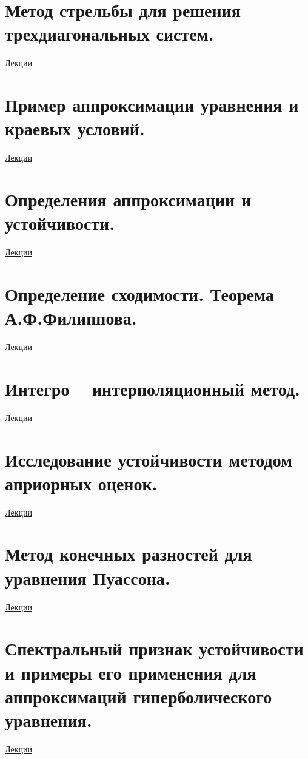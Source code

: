 \documentclass[specialist, subf, href, colorlinks=true, 12pt, times, mtpro, final]{disser}
\theoremstyle{definition}
\begin{document}
\section {Метод стрельбы для решения трехдиагональных систем.}
	\hyperlink {lects.112}{Лекции}\\

\section {Пример аппроксимации уравнения и краевых условий.}
	\hyperlink {lects.115}{Лекции}\\

\section {Определения аппроксимации и устойчивости.}
	\hyperlink {lects.118}{Лекции}\\

\section {Определение сходимости. Теорема А.Ф.Филиппова.}
	\hyperlink {lects.120}{Лекции}\\

\section {Интегро -- интерполяционный метод.}
	\hyperlink {lects.121}{Лекции}\\

\section {Исследование устойчивости методом априорных оценок.}
	\hyperlink {lects.125}{Лекции}\\

\section {Метод конечных разностей для уравнения Пуассона.}
	\hyperlink {lects.128}{Лекции}\\

\section {Спектральный признак устойчивости и примеры его применения для аппроксимаций гиперболического уравнения.}
	\hyperlink {lects.130}{Лекции}\\
\end{document}
